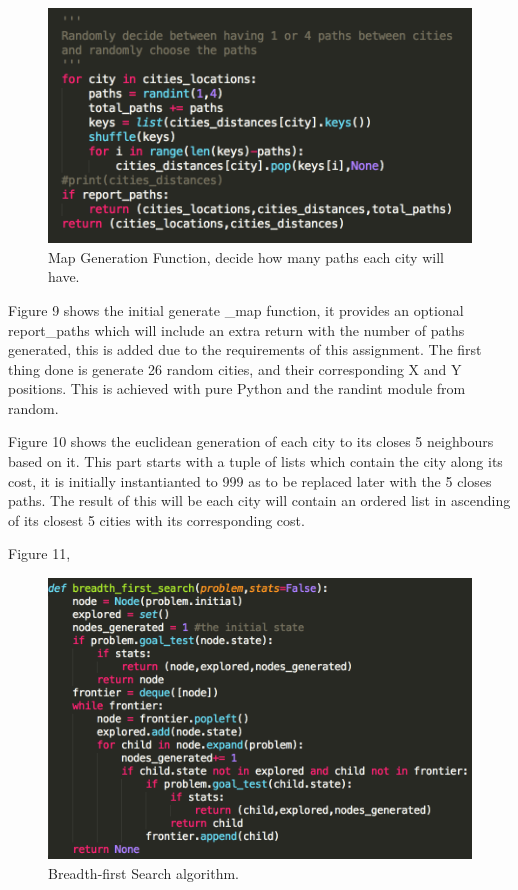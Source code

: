 \documentclass[12pt, letter]{article}
\begin{document}
\begin{figure}[htb]
  \centering
  \includegraphics[width=0.9 \textwidth]{./graphs/generate_map_3.png}
  \caption{Map Generation Function, decide how many paths each city will have.}
\end{figure}

Figure 9 shows the initial generate \_map function, it provides an optional report_paths which will include an extra return with the number of paths generated, this is added due to the requirements of this assignment. The first thing done is generate 26 random cities, and their corresponding X and Y positions. This is achieved with pure Python and the randint module from random. 

Figure 10 shows the euclidean generation of each city to its closes 5 neighbours based on it. This part starts with a tuple of lists which contain the city along its cost, it is initially instantianted to 999 as to be replaced later with the 5 closes paths. The result of this will be each city will contain an ordered list in ascending of its closest 5 cities with its corresponding cost. 

Figure 11, 

\FloatBarrier

\begin{figure}[htb]
  \centering
  \includegraphics[width=0.9 \textwidth]{./graphs/bfs.png}
  \caption{Breadth-first Search algorithm.}
\end{figure}
\end{document}
